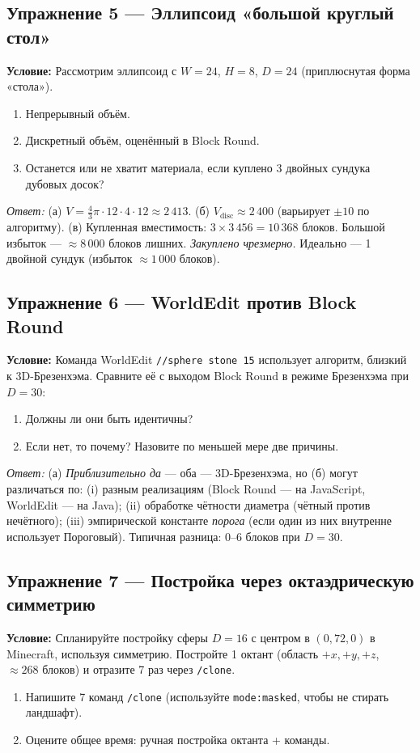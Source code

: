 \documentclass[12pt,a4paper]{scrartcl}
\newcommand{\cmd}[1]{\textcolor{earth}{\texttt{\small #1}}}
\begin{document}
\subsection*{Упражнение 5 --- Эллипсоид «большой круглый стол»}
\textbf{Условие:} Рассмотрим эллипсоид с $W = 24$, $H = 8$, $D = 24$ (приплюснутая форма «стола»).
\begin{enumerate}[label=\alph*),leftmargin=1.5em,itemsep=0.1em,topsep=0.2em,nosep]
  \item Непрерывный объём.
  \item Дискретный объём, оценённый в Block Round.
  \item Останется или не хватит материала, если куплено 3 двойных сундука дубовых досок?
\end{enumerate}

\emph{Ответ:}
(а) $V = \tfrac{4}{3}\pi \cdot 12 \cdot 4 \cdot 12 \approx 2\,413$.
(б) $V_{\mathrm{disc}} \approx 2\,400$ (варьирует $\pm 10$ по алгоритму).
(в) Купленная вместимость: $3 \times 3\,456 = 10\,368$ блоков. Большой избыток --- $\approx 8\,000$ блоков лишних. \emph{Закуплено чрезмерно.} Идеально --- 1 двойной сундук (избыток $\approx 1\,000$ блоков).

\subsection*{Упражнение 6 --- WorldEdit против Block Round}
\textbf{Условие:} Команда WorldEdit \cmd{//sphere stone 15} использует алгоритм, близкий к 3D-Брезенхэма. Сравните её с выходом Block Round в режиме Брезенхэма при $D = 30$:
\begin{enumerate}[label=\alph*),leftmargin=1.5em,itemsep=0.1em,topsep=0.2em,nosep]
  \item Должны ли они быть идентичны?
  \item Если нет, то почему? Назовите по меньшей мере две причины.
\end{enumerate}

\emph{Ответ:}
(а) \emph{Приблизительно да} --- оба --- 3D-Брезенхэма, но (б) могут различаться по: (i) разным реализациям (Block Round --- на JavaScript, WorldEdit --- на Java); (ii) обработке чётности диаметра (чётный против нечётного); (iii) эмпирической константе \emph{порога} (если один из них внутренне использует Пороговый). Типичная разница: 0--6 блоков при $D = 30$.

\subsection*{Упражнение 7 --- Постройка через октаэдрическую симметрию}
\textbf{Условие:} Спланируйте постройку сферы $D = 16$ с центром в $(0, 72, 0)$ в Minecraft, используя симметрию. Постройте 1 октант (область $+x, +y, +z$, $\approx 268$ блоков) и отразите 7 раз через \cmd{/clone}.
\begin{enumerate}[label=\alph*),leftmargin=1.5em,itemsep=0.1em,topsep=0.2em,nosep]
  \item Напишите 7 команд \cmd{/clone} (используйте \cmd{mode:masked}, чтобы не стирать ландшафт).
  \item Оцените общее время: ручная постройка октанта + команды.
\end{enumerate}
\end{document}
